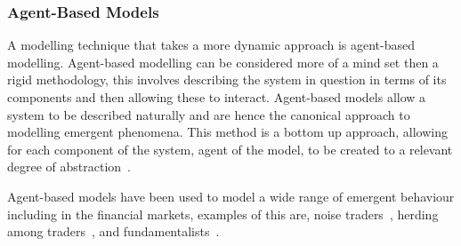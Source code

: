 \documentclass{article}
\begin{document}










\subsubsection{Agent-Based Models}
A modelling technique that takes a more dynamic approach is agent-based modelling. Agent-based modelling can be considered more of a mind set then a rigid methodology, this involves describing the system in question in terms of its components and then allowing these to interact. Agent-based models allow a system to be described naturally and are hence the canonical approach to modelling emergent phenomena. This method is a bottom up approach, allowing for each component of the system, agent of the model, to be created to a relevant degree of abstraction~\cite{abmhumsystems}.

Agent-based models have been used to model a wide range of emergent behaviour including in the financial markets, examples of this are, noise traders~\cite{abmnoisetraders}, herding among traders~\cite{abmherding}, and fundamentalists~\cite{abmfundemetilists}.
\end{document}
